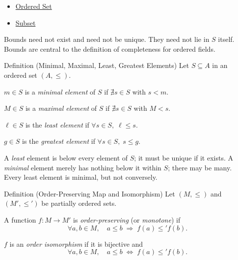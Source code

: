 \begin{dependencies}
\begin{itemize}
  \item \hyperref[def:ordered-set]{Ordered Set}
  \item \hyperref[def:subset]{Subset}
\end{itemize}
\end{dependencies}

\begin{remark*}[Consequence]
Bounds need not exist and need not be unique. They need not lie in $S$ itself.
Bounds are central to the definition of completeness for ordered fields.
\end{remark*}

\begin{propositionbox}{Definition (Minimal, Maximal, Least, Greatest Elements)}
\label{def:min-max}
Let $S \subseteq A$ in an ordered set $(A,\leq)$.

$m \in S$ is a \emph{minimal element} of $S$ if $\nexists s \in S$ with $s < m$.

$M \in S$ is a \emph{maximal element} of $S$ if $\nexists s \in S$ with $M < s$.

\smallskip
\label{def:least-greatest}
$\ell \in S$ is the \emph{least element} if $\forall s \in S,\; \ell \leq s$.

$g \in S$ is the \emph{greatest element} if $\forall s \in S,\; s \leq g$.
\end{propositionbox}

\begin{remark*}
A \emph{least} element is below every element of $S$; it must be unique if it
exists. A \emph{minimal} element merely has nothing below it within $S$; there
may be many. Every least element is minimal, but not conversely.
\end{remark*}

\begin{propositionbox}{Definition (Order-Preserving Map and Isomorphism)}
\label{def:order-pres}
Let $(M,\leq)$ and $(M',\leq')$ be partially ordered sets.

A function $f : M \to M'$ is \emph{order-preserving} (or \emph{monotone}) if
\[
\forall a,b \in M,\quad a \leq b \;\Longrightarrow\; f(a) \leq' f(b).
\]

$f$ is an \emph{order isomorphism}\label{def:order-iso} if it is bijective and
\[
\forall a,b \in M,\quad a \leq b \;\Longleftrightarrow\; f(a) \leq' f(b).
\]
\end{propositionbox}

